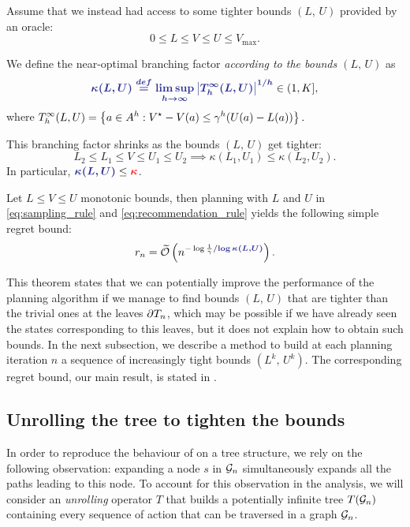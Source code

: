 \documentclass[runningheads]{llncs}
\begin{document}
Assume that we instead had access to some tighter bounds $(L,\,U)$ provided by an oracle: $$0\leq L\leq V\leq U\leq V_{\max}.$$
\begin{definition}
We define the near-optimal branching factor \emph{according to the bounds $(L,\,U)$} as 
\begin{equation}
\hlbb{\kappa(L,U) \eqdef \limsup_{h\rightarrow\infty} \left|\Tau_h^\infty(L,U)\right|^{1/h}}\in(1, K], 
\end{equation}
where
$ \displaystyle
     {T_h^\infty(L,U)}=\left\{a\in A^h: V^\star - V(a)\leq \gamma^{h}(U(a)-L(a))\right\}.
$
\end{definition}

\begin{lemma}
\label{lem:shrink}
This branching factor shrinks as the bounds $(L,\,U)$ get tighter:
\[L_2\leq L_1\leq V\leq U_1\leq U_2\implies \kappa(L_1,U_1) \leq \kappa(L_2,U_2).\]
In particular, $\hlbb{\kappa(L,U)} \leq \hlrb{\kappa}$.
\end{lemma}

\begin{theorem}
\label{thm:regret-bound-U}
Let $L \leq V\leq U$ monotonic bounds, then planning with $L$ and $U$ in \eqref{eq:sampling_rule} and \eqref{eq:recommendation_rule} yields the following simple regret bound:
\begin{equation*}
r_n = \tilde{\cO}\left(n^{-\log \frac{1}{\gamma}/\hlbb{\log \kappa(L,U)}}\right).
\end{equation*}
\end{theorem}


This theorem states that we can potentially improve the performance of the planning algorithm if we manage to find bounds $(L,\, U)$ that are tighter than the trivial ones at the leaves ${\partial T_n}$, which may be possible if we have already seen the states corresponding to this leaves, but it does not explain how to obtain such bounds. In the next subsection, we describe a method to build at each planning iteration $n$ a sequence of increasingly tight bounds $(L^k,\, U^k)$. The corresponding regret bound, our main result, is stated in .


\subsection{Unrolling the tree to tighten the bounds}
\label{sec:unrolling}

In order to reproduce the behaviour of  on a tree structure, we rely on the following observation:  expanding a node $s$ in $\mathcal{G}_n$ simultaneously expands all the paths leading to this node.
To account for this observation in the analysis, we will consider an \emph{unrolling} operator $T$ that builds a potentially infinite tree $T(\mathcal{G}_n)$ containing every sequence of action that can be traversed in a graph $\mathcal{G}_n$.
\end{document}
